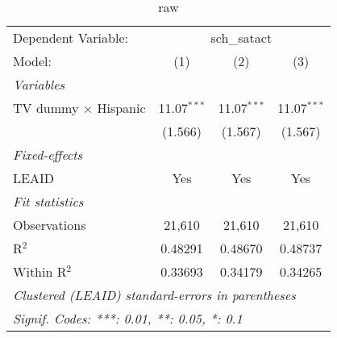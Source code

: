 \begin{table}[htbp]
\centering
\caption{ raw}
\begin{tabular}{lccc}
\tabularnewline\midrule\midrule
Dependent Variable:&\multicolumn{3}{c}{sch\_satact}\\
Model:&(1) & (2) & (3)\\
\midrule \emph{Variables}&   &   &  \\
TV dummy $\times$ Hispanic & 11.07$^{***}$ & 11.07$^{***}$ & 11.07$^{***}$\\
  &(1.566) & (1.567) & (1.567)\\
\midrule \emph{Fixed-effects}&   &   &  \\
LEAID & Yes & Yes & Yes\\
\midrule \emph{Fit statistics}&  & & \\
Observations & 21,610&21,610&21,610\\
R$^2$ & 0.48291&0.48670&0.48737\\
Within R$^2$ & 0.33693&0.34179&0.34265\\
\midrule\midrule\multicolumn{4}{l}{\emph{Clustered (LEAID) standard-errors in parentheses}}\\
\multicolumn{4}{l}{\emph{Signif. Codes: ***: 0.01, **: 0.05, *: 0.1}}\\
\end{tabular}
\end{table}

